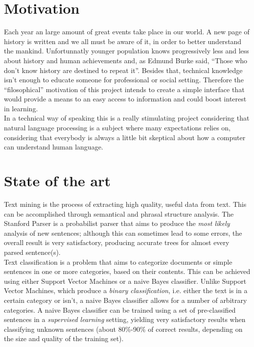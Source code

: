 \documentclass{llncs}
\begin{document}
\section{Motivation}
Each year an large amount of great events take place in our world. A new page of history is written and we all must be aware of it, in order to better understand the mankind. Unfortunnatly younger population knows progressively less and less about history and human achievements and, as Edmund Burke said, ``Those who don't know history are destined to repeat it''. Besides that, technical knowledge isn't enough to educate someone for professional or social setting.
Therefore the ``filosophical'' motivation of this project intends to create a simple interface that would provide a means to an easy access to information and could boost interest in learning.\\

In a technical way of speaking this is a really stimulating project considering that natural language processing is a subject where many expectations relies on, considering that everybody is always a little bit skeptical about how a computer can understand human language.

\section{State of the art}

Text mining is the process of extracting high quality, useful data from text. This can be accomplished through semantical and phrasal structure analysis. The Stanford Parser is a probabilist parser that aims to produce the \textit{most likely} analysis of new sentences; although this can sometimes lead to some errors, the overall result is very satisfactory, producing accurate trees for almost every parsed sentence(s).\\

Text classification is a problem that aims to categorize documents or simple sentences in one or more categories, based on their contents. This can be achieved using either Support Vector Machines or a naive Bayes classifier. Unlike Support Vector Machines, which produce a \textit{binary classification}, i.e. either the text is in a certain category or isn't, a naive Bayes classifier allows for a number of arbitrary categories. A naive Bayes classifier can be trained using a set of pre-classified sentences in a \textit{supervised learning} setting, yielding very satisfactory results when classifying unknown sentences (about 80\%-90\% of correct results, depending on the size and quality of the training set).
\end{document}
